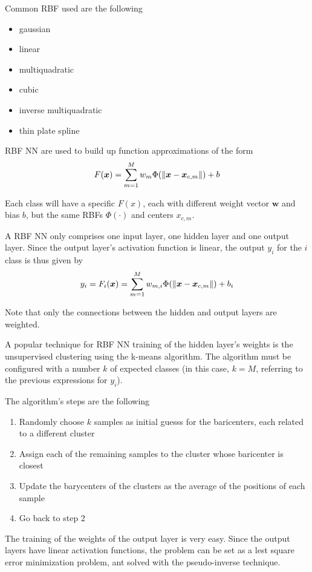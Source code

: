 \documentclass[oneside,onecolumn]{report}
\begin{document}
Common RBF used are the following
\begin{itemize}
    \item gaussian
    \item linear
    \item multiquadratic
    \item cubic
    \item inverse multiquadratic
    \item thin plate spline
\end{itemize}

RBF NN are used to build up function approximations of the form
$$ F(\bm x) = \sum_{m = 1}^M w_m \Phi(\norm{\bm x - \bm x_{c,m}}) + b $$

Each class will have a specific $F(x)$, each with different weight vector $\bm w$ and bias $b$, but the same RBFs $\Phi(\cdot)$ and centers $x_{c,m}$.

A RBF NN only comprises one input layer, one hidden layer and one output layer.
Since the output layer's activation function is linear, the output $y_i$ for the $i$ class is thus given by
$$ y_i = F_i(\bm x) = \sum_{m = 1}^M w_{m, i} \Phi(\norm{\bm x - \bm x_{c,m}}) + b_i $$

Note that only the connections between the hidden and output layers are weighted.

A popular technique for RBF NN training of the hidden layer's weights is the unsupervised clustering using the k-means algorithm.
The algorithm must be configured with a number $k$ of expected classes (in this case, $k = M$, referring to the previous expressions for $y_i$).

The algorithm's steps are the following
\begin{enumerate}
    \item Randomly choose $k$ samples as initial guesss for the baricenters, each related to a different cluster
    \item Assign each of the remaining samples to the cluster whose baricenter is closest
    \item Update the barycenters of the clusters as the average of the positions of each sample
    \item Go back to step 2
\end{enumerate}

The training of the weights of the output layer is very easy.
Since the output layers have linear activation functions, the problem can be set as a lest square error minimization problem, ant solved with the pseudo-inverse technique.
\end{document}
